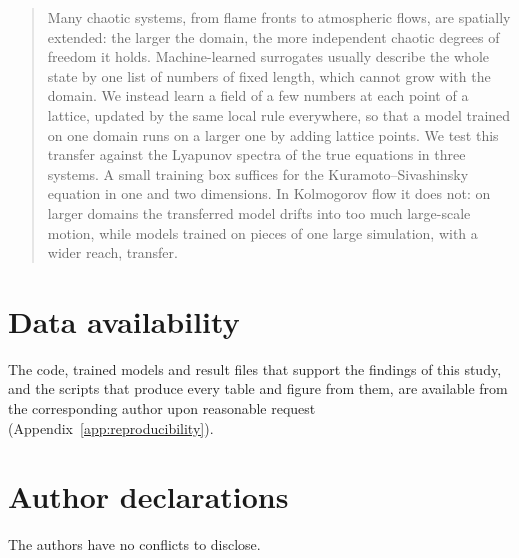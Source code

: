 \documentclass[aip,cha,reprint,amsmath,amssymb,nofootinbib,floatfix]{revtex4-2}
\begin{document}
\begin{quotation}
Many chaotic systems, from flame fronts to atmospheric flows, are spatially extended: the larger
the domain, the more independent chaotic degrees of freedom it holds. Machine-learned surrogates
usually describe the whole state by one list of numbers of fixed length, which cannot grow with
the domain. We instead learn a field of a few numbers at each point of a lattice, updated by the
same local rule everywhere, so that a model trained on one domain runs on a larger one by adding
lattice points. We test this transfer against the Lyapunov spectra of the true equations in
three systems. A small training box suffices for the Kuramoto--Sivashinsky equation in one and
two dimensions. In Kolmogorov flow it does not: on larger domains the transferred model drifts
into too much large-scale motion, while models trained on pieces of one large simulation, with a
wider reach, transfer.
\end{quotation}











\appendix






\begin{acknowledgments}
\end{acknowledgments}

\section*{Data availability}
The code, trained models and result files that support the findings of this study, and the
scripts that produce every table and figure from them, are available from the corresponding
author upon reasonable request (Appendix~\ref{app:reproducibility}).

\section*{Author declarations}
 The authors have no conflicts to disclose.



\end{document}
